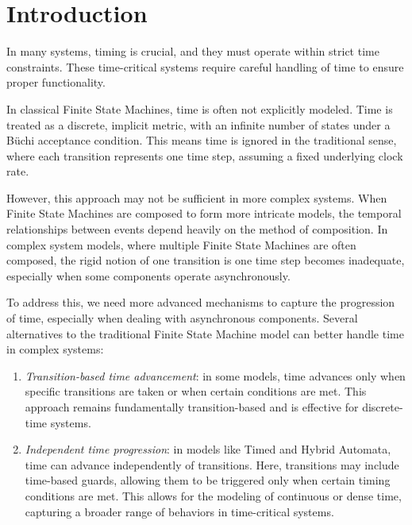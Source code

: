 \section{Introduction}

In many systems, timing is crucial, and they must operate within strict time constraints. 
These time-critical systems require careful handling of time to ensure proper functionality.

In classical Finite State Machines, time is often not explicitly modeled. 
Time is treated as a discrete, implicit metric, with an infinite number of states under a Büchi acceptance condition. 
This means time is ignored in the traditional sense, where each transition represents one time step, assuming a fixed underlying clock rate.

However, this approach may not be sufficient in more complex systems.
When Finite State Machines are composed to form more intricate models, the temporal relationships between events depend heavily on the method of composition. 
In complex system models, where multiple Finite State Machines are often composed, the rigid notion of one transition is one time step becomes inadequate, especially when some components operate asynchronously.

To address this, we need more advanced mechanisms to capture the progression of time, especially when dealing with asynchronous components. 
Several alternatives to the traditional Finite State Machine model can better handle time in complex systems:
\begin{enumerate}
    \item \textit{Transition-based time advancement}: in some models, time advances only when specific transitions are taken or when certain conditions are met. 
        This approach remains fundamentally transition-based and is effective for discrete-time systems.
    \item \textit{Independent time progression}: in models like Timed and Hybrid Automata, time can advance independently of transitions. 
        Here, transitions may include time-based guards, allowing them to be triggered only when certain timing conditions are met. 
        This allows for the modeling of continuous or dense time, capturing a broader range of behaviors in time-critical systems.
\end{enumerate}